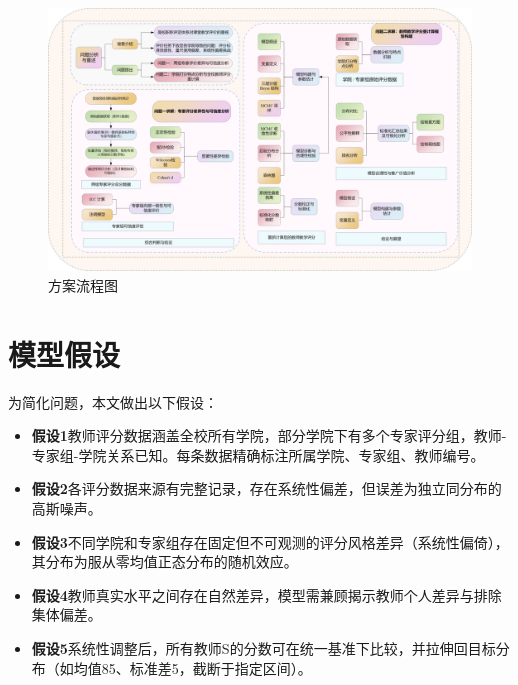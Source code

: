 \documentclass[withoutpreface,bwprint]{cumcmthesis}
\begin{document}
\begin{figure}[H]
    \centering
    \includegraphics[width=1\textwidth]{figures/flow_chat.png} %
    \caption{方案流程图}
\end{figure}


\section{模型假设}

为简化问题，本文做出以下假设：

\begin{itemize}[itemindent=2em]

\item \textbf{假设1}教师评分数据涵盖全校所有学院，部分学院下有多个专家评分组，教师-专家组-学院关系已知。每条数据精确标注所属学院、专家组、教师编号。
\item \textbf{假设2}各评分数据来源有完整记录，存在系统性偏差，但误差为独立同分布的高斯噪声。
\item \textbf{假设3}不同学院和专家组存在固定但不可观测的评分风格差异（系统性偏倚），其分布为服从零均值正态分布的随机效应。
\item \textbf{假设4}教师真实水平之间存在自然差异，模型需兼顾揭示教师个人差异与排除集体偏差。
\item \textbf{假设5}系统性调整后，所有教师S的分数可在统一基准下比较，并拉伸回目标分布（如均值85、标准差5，截断于指定区间）。
\end{itemize}


\end{document}
